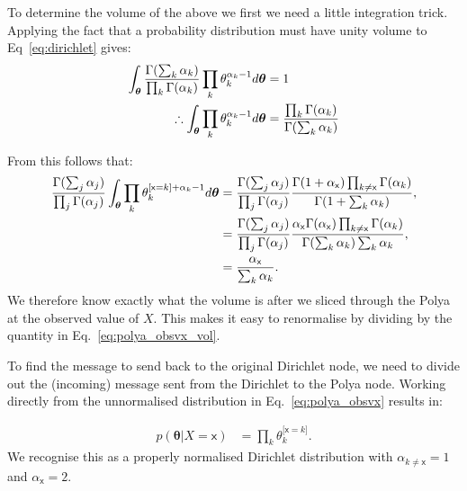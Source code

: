 \documentclass[oneside,english]{scrbook}
\begin{document}
To determine the volume of the above we first we need a little
integration trick. Applying the fact that a probability distribution
must have unity volume to Eq~\ref{eq:dirichlet} gives:
\begin{align}
  \int_{\bm{\theta}}\frac{\Gamma(\sum_k\alpha_k)}{\prod_{k}\Gamma(\alpha_k)}
  \prod_{k}\theta_k^{\alpha_k-1} d\bm{\theta} &= 1 \notag\\
  \therefore \int_{\bm{\theta}} \prod_{k}\theta_k^{\alpha_k-1} d\bm{\theta}
  &= \frac{\prod_{k}\Gamma(\alpha_k)}{\Gamma(\sum_k\alpha_k)} \label{eq:dir_int_trick}
\end{align}

From this follows that:
\begin{align}
  \frac{\Gamma(\sum_j\alpha_j)}{\prod_{j}\Gamma(\alpha_j)} \int_{\bm{\theta}}
  \prod_{k}\theta_k^{\mathbb{[}\mathsf{x}=k\mathbb{]}+\alpha_k-1} d\bm{\theta}
  &= \frac{\Gamma(\sum_j{\alpha_j})}{\prod_{j}\Gamma(\alpha_j)} \frac{\Gamma(1+\alpha_\mathsf{x})\prod_{k\neq{\mathsf{x}}}\Gamma(\alpha_k)}{\Gamma(1+\sum_k\alpha_k)},\notag \\
  &= \frac{\Gamma(\sum_j{\alpha_j})}{\prod_{j}\Gamma(\alpha_j)} \frac{\alpha_\mathsf{x}\Gamma(\alpha_\mathsf{x})\prod_{k\neq{\mathsf{x}}}\Gamma(\alpha_k)}{\Gamma(\sum_k\alpha_k)\sum_k\alpha_k}, \notag \\
  &= \frac{\alpha_\mathsf{x}}{\sum_k\alpha_k}. \label{eq:polya_obsvx_vol}
\end{align}
We therefore know exactly what the volume is after we sliced through
the Polya at the observed value of $X$. This makes it easy to
renormalise by dividing by the quantity in Eq.~\ref{eq:polya_obsvx_vol}.

To find the message to send back to the original Dirichlet node, we
need to divide out the (incoming) message sent from the Dirichlet to
the Polya node. Working directly from the unnormalised distribution in
Eq.~\ref{eq:polya_obsvx} results in:

\begin{align}
  p(\bm{\theta}|X=\mathsf{x})
  &= \prod_{k}\theta_k^{\mathbb{[}\mathsf{x}=k\mathbb{]}}. \label{eq:polya_observed}
\end{align}
We recognise this as a properly normalised Dirichlet distribution with
$\alpha_{k\neq \mathsf{x}}=1$ and $\alpha_{\mathsf{x}}=2$.
\end{document}
